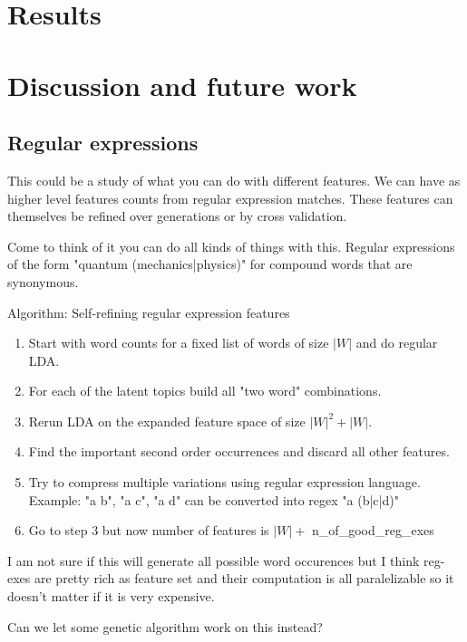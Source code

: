 \documentclass[11pt]{article}
\begin{document}
    
\section{Results}

	
	
	
	
\section{Discussion and future work}

	\subsection{Regular expressions}
	
		This could be a study of what you can do with different features.
		We can have as higher level features counts from regular expression matches.
		These features can themselves be refined over generations or by cross validation.
		
		Come to think of it you can do all kinds of things with this.
		Regular expressions of the form "quantum (mechanics|physics)" for compound words 
		that are synonymous. 
		
		Algorithm: Self-refining regular expression features
		\begin{enumerate}
			\item	Start with word counts for a fixed list of words of size $|W|$ and do regular LDA.
			\item	For each of the latent topics build all "two word" combinations.
			\item	Rerun LDA on the expanded feature space of size $|W|^2 + |W|$.
			\item	Find the important second order occurrences and discard all other features.
			\item	Try to compress multiple variations using regular expression language. \\
					Example: "a b", "a c", "a d"  can be converted into regex "a (b|c|d)"
			\item	Go to step 3 but now number of features is $|W|+$ n\_of\_good\_reg\_exes
		\end{enumerate}

		I am not sure if this will generate all possible word occurences but I think reg-exes are
		pretty rich as feature set and their computation is all paralelizable so it doesn't matter if 
		it is very expensive.
		
		
		Can we let some genetic algorithm work on this instead?
\end{document}
